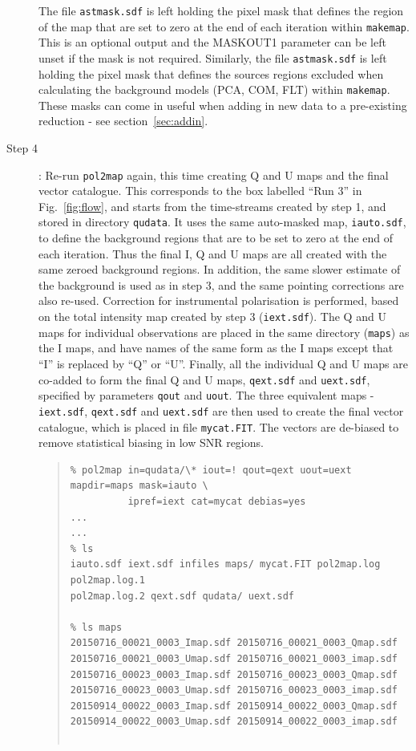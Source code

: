 \documentclass[twoside,11pt]{starlink}
\begin{document}
\begin{description}
The file \texttt{astmask.sdf} is left holding the pixel mask that defines
the region of the map that are set to zero at the end of each iteration
within \texttt{makemap}. This is an optional output and the MASKOUT1
parameter can be left unset if the mask is not required. Similarly, the
file \texttt{astmask.sdf} is left holding the pixel mask that defines the
sources regions excluded when calculating the background models (PCA, COM,
FLT) within \texttt{makemap}. These masks can come in useful when adding
in new data to a pre-existing reduction - see section~\ref{sec:addin}.

\item[Step 4]:  Re-run \texttt{pol2map} again, this time creating Q and U
maps and the final vector catalogue. This corresponds to the box
labelled ``Run 3'' in Fig.~\ref{fig:flow}, and starts from the
time-streams created by step 1, and stored in directory \texttt{qudata}.
It uses the same auto-masked map, \texttt{iauto.sdf}, to define the
background regions that are to be set to zero at the end of each
iteration. Thus the final I, Q and U maps are all created with the same
zeroed background regions. In addition, the same slower estimate of the
background is used as in step 3, and the same pointing corrections are
also re-used. Correction for instrumental polarisation is performed,
based on the total intensity map created by step 3 (\texttt{iext.sdf}).
The Q and U maps for individual observations are placed in the same
directory (\texttt{maps}) as the I maps, and have names of the same form
as the I maps except that ``I'' is replaced by ``Q'' or ``U''. Finally,
all the individual Q and U maps are co-added to form the final Q and U
maps, \texttt{qext.sdf} and \texttt{uext.sdf}, specified by parameters
\texttt{qout} and \texttt{uout}. The three equivalent maps -
\texttt{iext.sdf}, \texttt{qext.sdf} and \texttt{uext.sdf} are then used
to create the final vector catalogue, which is placed in file
\texttt{mycat.FIT}. The vectors are de-biased to remove statistical
biasing in low SNR regions.

\begin{quote}
\begin{verbatim}
% pol2map in=qudata/\* iout=! qout=qext uout=uext mapdir=maps mask=iauto \
          ipref=iext cat=mycat debias=yes
...
...
% ls
iauto.sdf iext.sdf infiles maps/ mycat.FIT pol2map.log pol2map.log.1
pol2map.log.2 qext.sdf qudata/ uext.sdf

% ls maps
20150716_00021_0003_Imap.sdf 20150716_00021_0003_Qmap.sdf
20150716_00021_0003_Umap.sdf 20150716_00021_0003_imap.sdf
20150716_00023_0003_Imap.sdf 20150716_00023_0003_Qmap.sdf
20150716_00023_0003_Umap.sdf 20150716_00023_0003_imap.sdf
20150914_00022_0003_Imap.sdf 20150914_00022_0003_Qmap.sdf
20150914_00022_0003_Umap.sdf 20150914_00022_0003_imap.sdf


\end{verbatim}
\end{quote}
\end{description}
\end{document}
